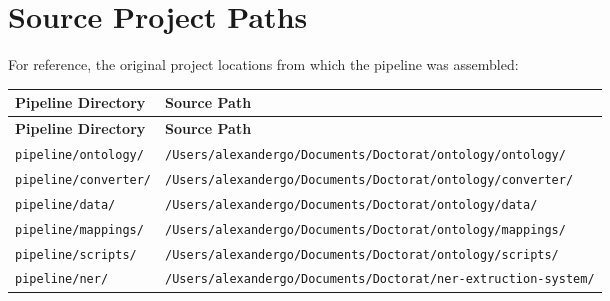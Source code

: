 \documentclass[12pt]{article}
\newcommand{\filepath}[1]{\texttt{\small #1}}
\begin{document}
\section{Source Project Paths}

For reference, the original project locations from which the pipeline was assembled:

\begin{longtable}{|p{6cm}|p{8cm}|}
\hline
\textbf{Pipeline Directory} & \textbf{Source Path} \\
\hline
\endfirsthead
\hline
\textbf{Pipeline Directory} & \textbf{Source Path} \\
\hline
\endhead
\hline
\endfoot
\filepath{pipeline/ontology/} & \filepath{/Users/alexandergo/Documents/Doctorat/ontology/ontology/} \\
\hline
\filepath{pipeline/converter/} & \filepath{/Users/alexandergo/Documents/Doctorat/ontology/converter/} \\
\hline
\filepath{pipeline/data/} & \filepath{/Users/alexandergo/Documents/Doctorat/ontology/data/} \\
\hline
\filepath{pipeline/mappings/} & \filepath{/Users/alexandergo/Documents/Doctorat/ontology/mappings/} \\
\hline
\filepath{pipeline/scripts/} & \filepath{/Users/alexandergo/Documents/Doctorat/ontology/scripts/} \\
\hline
\filepath{pipeline/ner/} & \filepath{/Users/alexandergo/Documents/Doctorat/ner-extruction-system/} \\
\hline
\end{longtable}
\end{document}
